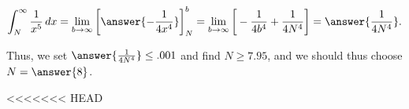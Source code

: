 \documentclass{ximera}
\begin{document}
\begin{exercise}
\begin{exercise}
\begin{hint}
\[
\int_N^\infty \frac{1}{x^5} \d x = \lim_{b \to \infty} \eval{\answer{-\frac{1}{4x^4}}}_N^b = \lim_{b \to \infty} \eval{-\frac{1}{4b^4}+\frac{1}{4N^4}} =\answer{\frac{1}{4N^4}}. 
\]


Thus, we set $\answer{\frac{1}{4N^4}} \leq .001$ and find $N \geq 7.95$, and we should thus choose $N = \answer{8}$.
\end{hint}
\end{exercise}
<<<<<<< HEAD





\end{exercise}
\end{document}
